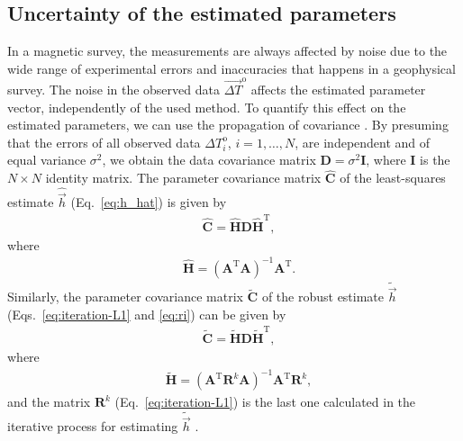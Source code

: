 \documentclass[journal abbreviation, npg]{copernicus}
\begin{document}
\subsection{Uncertainty of the estimated parameters}

In a magnetic survey, the measurements are always affected by noise due to
the wide range of experimental errors and inaccuracies that happens in
a geophysical survey. The noise in the observed data $\vec{\Delta
T}^\mathrm{o}$ affects the estimated parameter vector, independently of the
used method. To quantify this effect on the estimated parameters, we can use
the propagation of covariance \citep{bard1973,aster-etal2005}. By presuming
that the errors of all observed data ${\Delta T}^\mathrm{o}_{i}$, $i = 1,
\ldots, N$, are independent and of equal variance $\sigma^{2}$, we obtain the
data covariance matrix $\mathbf{D} = \sigma^{2} \mathbf{I}$, where
$\mathbf{I}$ is the $N \times N$ identity matrix. The parameter covariance
matrix $\hat{\mathbf{C}}$ of the least-squares estimate $\hat{\vec{h}}$
(Eq.~\ref{eq:h_hat}) is given by
\begin{align}
 &
\hat{\mathbf{C}} = \hat{\mathbf{H}}  \mathbf{D}  \hat{\mathbf{H}}^{\mathrm{T}} ,
\label{eq:cov-h-hat}
\end{align}
where
\begin{align}
 &
\hat{\mathbf{H}} = (\mathbf{A}^{\mathrm{T}}\mathbf{A} )^{-1} \mathbf{A}^{\mathrm{T}} .
\label{eq:H-h-hat}
\end{align}
Similarly, the parameter covariance matrix $\tilde{\mathbf{C}}$ of the robust
estimate $\tilde{\vec{h}}$ (Eqs.~\ref{eq:iteration-L1} and \ref{eq:ri}) can
be given by
\begin{align}
 &
\tilde{\mathbf{C}} = \tilde{\mathbf{H}}  \mathbf{D}
\tilde{\mathbf{H}}^{\mathrm{T}} ,
\label{eq:cov-h-tilde}
\end{align}
where
\begin{align}
 &
\tilde{\mathbf{H}} = (\mathbf{A}^{\mathrm{T}} \mathbf{R}^{k} \mathbf{A} )^{-1}
\mathbf{A}^{\mathrm{T}} \mathbf{R}^{k} ,
\label{eq:H-h-tilde}
\end{align}
and the matrix $\mathbf{R}^{k}$ (Eq.~\ref{eq:iteration-L1}) is the last one
calculated in the iterative process for estimating $\tilde{\vec{h}}$
\citep{bard1973,aster-etal2005}.
\end{document}
